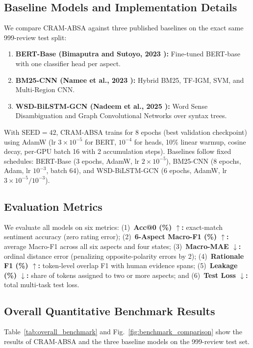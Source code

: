 \documentclass{llncs}
\begin{document}
\subsection{Baseline Models and Implementation Details}
\label{subsec:baselines_implementation}
We compare CRAM-ABSA against three published baselines on the exact same 999-review test split:
\begin{enumerate}
    \item \textbf{BERT-Base (Bimaputra and Sutoyo, 2023 \cite{ref01_bimaputra2023}):} Fine-tuned BERT-base with one classifier head per aspect.
    \item \textbf{BM25-CNN (Namee et al., 2023 \cite{ref04_namee2023}):} Hybrid BM25, TF-IGM, SVM, and Multi-Region CNN.
    \item \textbf{WSD-BiLSTM-GCN (Nadeem et al., 2025 \cite{ref09_nadeem2025}):} Word Sense Disambiguation and Graph Convolutional Networks over syntax trees.
\end{enumerate}
With $\text{SEED}=42$, CRAM-ABSA trains for 8 epochs (best validation checkpoint) using AdamW (lr $3\times 10^{-5}$ for BERT, $10^{-4}$ for heads, 10\% linear warmup, cosine decay, per-GPU batch 16 with 2 accumulation steps). Baselines follow fixed schedules: BERT-Base (3 epochs, AdamW, lr $2\times 10^{-5}$), BM25-CNN (8 epochs, Adam, lr $10^{-3}$, batch 64), and WSD-BiLSTM-GCN (6 epochs, AdamW, lr $3\times 10^{-5}/10^{-3}$).

\subsection{Evaluation Metrics}
\label{subsec:evaluation_metrics}
We evaluate all models on six metrics: (1)~\textbf{Acc@0 (\%) $\uparrow$:} exact-match sentiment accuracy (zero rating error); (2)~\textbf{6-Aspect Macro-F1 (\%) $\uparrow$:} average Macro-F1 across all six aspects and four states; (3)~\textbf{Macro-MAE $\downarrow$:} ordinal distance error (penalizing opposite-polarity errors by 2); (4)~\textbf{Rationale F1 (\%) $\uparrow$:} token-level overlap F1 with human evidence spans; (5)~\textbf{Leakage (\%) $\downarrow$:} share of tokens assigned to two or more aspects; and (6)~\textbf{Test Loss $\downarrow$:} total multi-task test loss.

\FloatBarrier
\subsection{Overall Quantitative Benchmark Results}
\label{subsec:overall_results}
Table~\ref{tab:overall_benchmark} and Fig.~\ref{fig:benchmark_comparison} show the results of CRAM-ABSA and the three baseline models on the 999-review test set.
\end{document}
